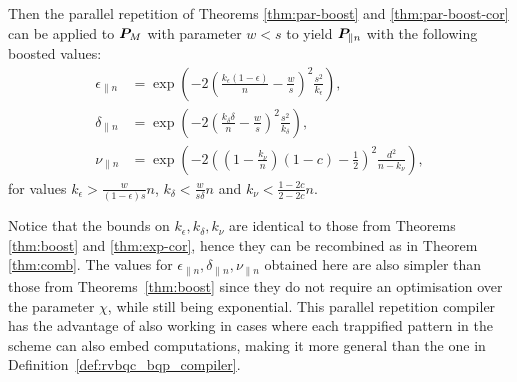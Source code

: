 \documentclass[12pt]{iopart}
\renewcommand{\1}{\mathds{1}}
\begin{document}
Then the parallel repetition of Theorems \ref{thm:par-boost} and \ref{thm:par-boost-cor} can be applied to $\bm{P}_M$ with parameter $w < s$ to yield $\bm{P}_{\parallel n}$ with the following boosted values:
\begin{align}
	\epsilon_{\parallel n} &= \exp \left( -2 \left(\frac{k_\epsilon (1-\epsilon)}{n} - \frac{w}{s}\right)^2 \frac{s^2}{k_\epsilon} \right),\\
	\delta_{\parallel n} &= \exp \left( -2 \left(\frac{k_\delta \delta}{n} - \frac{w}{s}\right)^2 \frac{s^2}{k_\delta} \right),\\
	\nu_{\parallel n} &= \exp \left( -2 \left(\left(1 - \frac{k_\nu}{n}\right)(1 - c) - \frac{1}{2}\right)^2 \frac{d^2}{n - k_\nu} \right),
\end{align}
for values $k_\epsilon > \frac{w}{(1-\epsilon)s}n$, $k_\delta < \frac{w}{s\delta}n$ and $k_\nu < \frac{1 - 2c}{2 - 2c}n$.

Notice that the bounds on $k_\epsilon, k_\delta, k_\nu$ are identical to those from Theorems \ref{thm:boost} and \ref{thm:exp-cor}, hence they can be recombined as in Theorem \ref{thm:comb}. The values for $\epsilon_{\parallel n}, \delta_{\parallel n}, \nu_{\parallel n}$ obtained here are also simpler than those from Theorems~\ref{thm:boost} since they do not require an optimisation over the parameter $\chi$, while still being exponential. This parallel repetition compiler has the advantage of also working in cases where each trappified pattern in the scheme can also embed computations, making it more general than the one in Definition~\ref{def:rvbqc_bqp_compiler}.  
\end{document}
